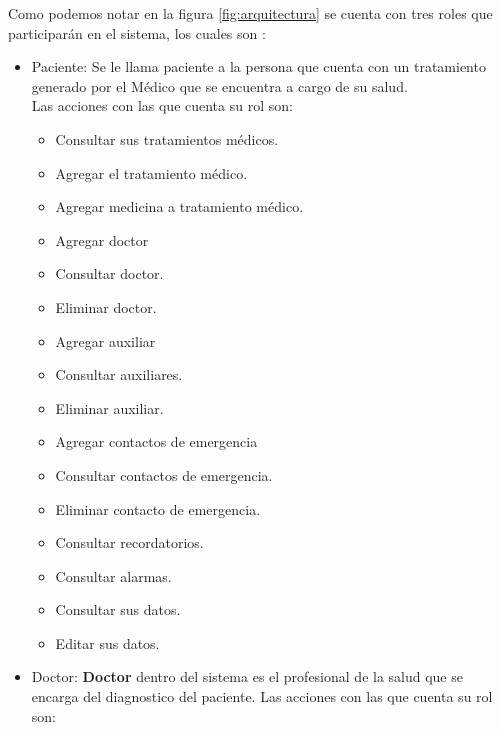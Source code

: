 Como podemos notar en la figura \ref{fig:arquitectura} se cuenta con tres roles que participarán en el sistema, los cuales son :
\begin{itemize}

	\item Paciente: Se le llama paciente a la persona que cuenta con un tratamiento generado por el Médico que se encuentra a cargo de su salud.\\
	
	Las acciones con las que cuenta su rol son:
	\begin{itemize}
		\item Consultar sus tratamientos médicos.
		\item Agregar el tratamiento médico.
		\item Agregar medicina a tratamiento médico.
		\item Agregar doctor
		\item Consultar doctor.
		\item Eliminar doctor.
		\item Agregar auxiliar
		\item Consultar auxiliares.
		\item Eliminar auxiliar.
		\item Agregar contactos de emergencia
		\item Consultar contactos de emergencia.
		\item Eliminar contacto de emergencia.
		\item Consultar recordatorios.
		\item Consultar alarmas.
		\item Consultar sus datos.
		\item Editar sus datos.
	\end{itemize}

	\item Doctor: \textbf{Doctor} dentro del sistema es el profesional de la salud que se encarga del diagnostico del paciente.
	Las acciones con las que cuenta su rol son:
		\begin{itemize}
			

\end{itemize}
\end{itemize}
